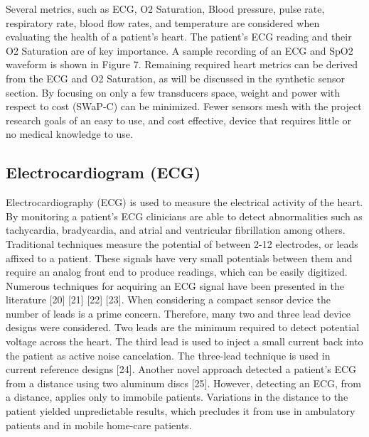 Several metrics, such as ECG, O2 Saturation, Blood pressure, pulse rate, respiratory rate, blood flow rates, and temperature are considered when evaluating the health of a patient’s heart. The patient’s ECG reading and their O2 Saturation are of key importance. A sample recording of an ECG and SpO2 waveform is shown in Figure 7. Remaining required heart metrics can be derived from the ECG and O2 Saturation, as will be discussed in the synthetic sensor section. By focusing on only a few transducers space, weight and power with respect to cost (SWaP-C) can be minimized. Fewer sensors mesh with the project research goals of an easy to use, and cost effective, device that requires little or no medical knowledge to use.

\subsection{Electrocardiogram (ECG)}
Electrocardiography (ECG) is used to measure the electrical activity of the heart. By monitoring a patient’s ECG clinicians are able to detect abnormalities such as tachycardia, bradycardia, and atrial and ventricular fibrillation among others. Traditional techniques measure the potential of between 2-12 electrodes, or leads affixed to a patient. These signals have very small potentials between them and require an analog front end to produce readings, which can be easily digitized. Numerous techniques for acquiring an ECG signal have been presented in the literature [20] [21] [22] [23].  When considering a compact sensor device the number of leads is a prime concern. Therefore, many two and three lead device designs were considered. Two leads are the minimum required to detect potential voltage across the heart. The third lead is used to inject a small current back into the patient as active noise cancelation. The three-lead technique is used in current reference designs [24]. Another novel approach detected a patient’s ECG from a distance using two aluminum discs [25]. However, detecting an ECG, from a distance, applies only to immobile patients. Variations in the distance to the patient yielded unpredictable results, which precludes it from use in ambulatory patients and in mobile home-care patients. 


